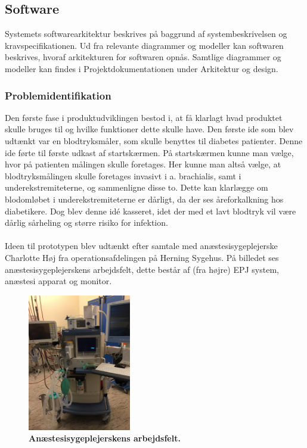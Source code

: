 \subsection{Software}
Systemets softwarearkitektur beskrives på baggrund af systembeskrivelsen og kravspecifikationen. Ud fra relevante diagrammer og modeller kan softwaren beskrives, hvoraf arkitekturen for softwaren opnås. Samtlige diagrammer og modeller kan findes i Projektdokumentationen under Arkitektur og design.
\subsubsection{Problemidentifikation}
Den første fase i produktudviklingen bestod i, at få klarlagt hvad produktet skulle bruges til og hvilke funktioner dette skulle have. Den første ide som blev udtænkt var en blodtryksmåler, som skulle benyttes til diabetes patienter. Denne ide førte til første udkast af startskærmen. På startskærmen kunne man vælge, hvor på patienten målingen skulle foretages. Her kunne man altså vælge, at blodtryksmålingen skulle foretages invasivt i a. brachialis, samt i underekstremiteterne, og sammenligne disse to. Dette kan klarlægge om blodomløbet i underekstremiteterne er dårligt, da der ses åreforkalkning hos diabetikere. Dog blev denne idé kasseret, idet der med et lavt blodtryk vil være dårlig sårheling og større risiko for infektion.\\\\
Ideen til prototypen blev udtænkt efter samtale med anæstesisygeplejerske Charlotte Høj fra operationsafdelingen på Herning Sygehus. På billedet ses anæstesisygeplejerskens arbejdsfelt, dette består af (fra højre) EPJ system, anæstesi apparat og monitor.
\begin{figure}[H]
\includegraphics[width =0.4\textwidth , center]{billeder/anastesi}
\caption{\textbf{Anæstesisygeplejerskens arbejdsfelt.}}
\end{figure}
